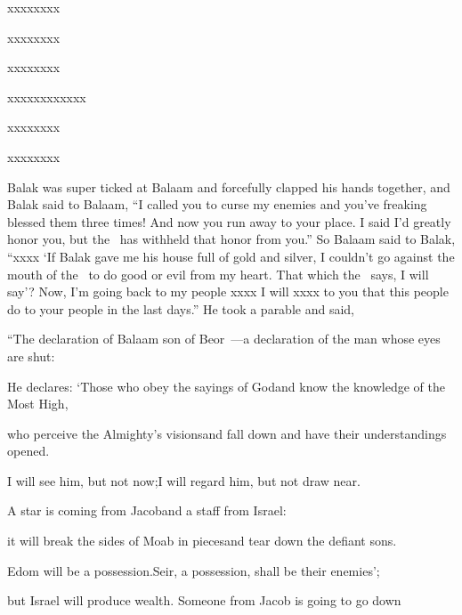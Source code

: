 \begin{inparaenum}
  \pb{} xxxx\pa{}xxxx%

  \pb{}xxxx\pa{}xxxx%

  \pa{} xxxx\pa{}xxxx%

  \pc{}xxxx\pa{}xxxx\pa{}xxxx%

  \pa{} xxxx\pa{}xxxx%

  \pb{}xxxx\pa{}xxxx%

   Balak was super ticked at Balaam and forcefully clapped his hands together, and Balak said to Balaam, ``I called you to curse my enemies and you've freaking blessed them three times!%
   And now you run away to your place. I said I'd greatly honor you, but the \lord\ has withheld that honor from you.''%
   So Balaam said to Balak, ``xxxx%
   `If Balak gave me his house full of gold and silver, I couldn't go against the mouth of the \lord\ to do good or evil from my heart. That which the \lord\ says, I will say'?%
   Now, I'm going back to my people xxxx I will xxxx to you that this people do to your people in the last days.''%
   He took a parable and said,%

  \pb{}``The declaration of Balaam son of Beor~---\pa{}a declaration of the man whose eyes are shut:%

  \pa{} He declares:%
  `Those who obey the sayings of God\pa{}and know the knowledge of the Most High,%

  \pb{}who perceive the Almighty's visions\pa{}and fall down and have their understandings opened.%

  \pb{} I will see him, but not now;\pa{}I will regard him, but not draw near.%

  \pb{}A star is coming from Jacob\pa{}and a staff from Israel:%

  \pb{}it will break the sides of Moab in pieces\pa{}and tear down the defiant sons.%

  \pb{} Edom will be a possession.\pa{}Seir, a possession, shall be their enemies';%

  \pb{}but Israel will produce wealth.\pa{} Someone from Jacob is going to go down%


\end{inparaenum}
